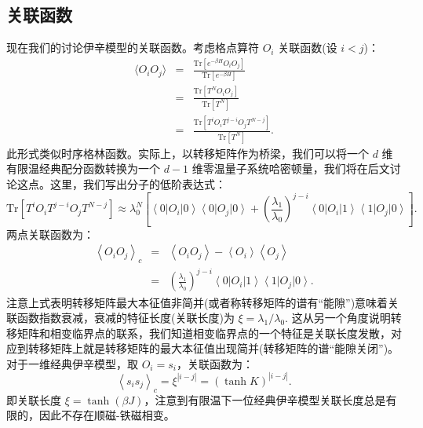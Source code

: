 \documentclass[UTF8]{ctexart}
\begin{document}
\subsection*{关联函数}
\noindent
现在我们的讨论伊辛模型的关联函数。考虑格点算符 $O_{i}$ 关联函数(设 $i<j$)：
\begin{eqnarray}
	\langle O_i O_j \rangle  
	& = & \frac{\mathrm{Tr} [e^{-\beta H} O_i O_j]}{\mathrm{Tr}[e^{-\beta H}]} \nonumber \\
 	& = & \frac{\mathrm{Tr} [T^{N}O_i O_j ]}{\mathrm{Tr}[T^{N}]}\nonumber \\
 	& = & \frac{\mathrm{Tr}[T^{i}O_i T^{j-i}O_j T^{N-j}]}{\mathrm{Tr}[T^{N}]}.
\end{eqnarray}
此形式类似时序格林函数。实际上，以转移矩阵作为桥梁，我们可以将一个 $d$ 维有限温经典配分函数转换为一个 $d - 1$ 维零温量子系统哈密顿量，我们将在后文讨论这点。这里，我们写出分子的低阶表达式：
\begin{equation}
	\mathrm{Tr} [T^{i}O_{i}T^{j-i}O_{j}T^{N-j}]
	\approx \lambda_0^N \left[\left\langle 0\right|O_{i}\left|0\right\rangle \left\langle 0\right|O_{j}\left|0\right\rangle +\left(\frac{\lambda_{1}}{\lambda_{0}}\right)^{j-i}\left\langle 0\right|O_{i}\left|1\right\rangle \left\langle 1\right|O_{j}\left|0\right\rangle \right].
\end{equation}
两点关联函数为：
\begin{eqnarray}
\left\langle O_{i}O_{j}\right\rangle _{c} & = & \left\langle O_{i}O_{j}\right\rangle -\left\langle O_{i}\right\rangle \left\langle O_{j}\right\rangle \nonumber \\
 & = & \left(\frac{\lambda_{1}}{\lambda_{0}}\right)^{j-i}\left\langle 0\right|O_{i}\left|1\right\rangle \left\langle 1\right|O_{j}\left|0\right\rangle .
\end{eqnarray}
注意上式表明转移矩阵最大本征值非简并(或者称转移矩阵的谱有“能隙”)意味着关联函数指数衰减，衰减的特征长度(关联长度)为 $\xi = \lambda_{1}/\lambda_{0}$. 这从另一个角度说明转移矩阵和相变临界点的联系，我们知道相变临界点的一个特征是关联长度发散，对应到转移矩阵上就是转移矩阵的最大本征值出现简并(转移矩阵的谱“能隙关闭”)。对于一维经典伊辛模型，取 $O_{i}=s_{i}$，关联函数为：
\begin{equation}
	\left\langle s_{i}s_{j}\right\rangle_c
	= \xi^{|i-j|}
	= \left(\tanh K\right)^{\left|i-j\right|}.
\end{equation}
即关联长度 $\xi = \tanh (\beta J)$，注意到有限温下一位经典伊辛模型关联长度总是有限的，因此不存在顺磁-铁磁相变。
\end{document}

